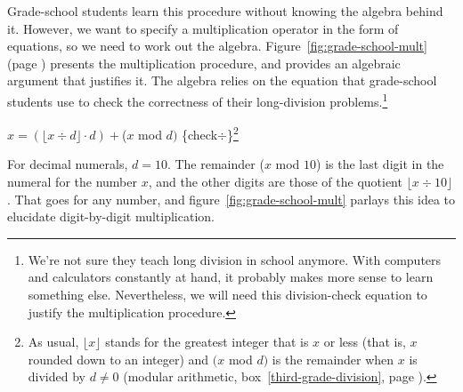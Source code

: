 Grade-school students learn this procedure
without knowing the algebra behind it.
However, we want to specify a
multiplication operator in the form of equations,
so we need to work out the algebra.
Figure~\ref{fig:grade-school-mult} (page \pageref{fig:grade-school-mult})
presents the multiplication procedure,
and provides an algebraic argument that justifies it.
The algebra relies on the equation
that grade-school students use to check the correctness of their long-division
problems.\footnote{We're not
sure they teach long division in school anymore.
With computers and calculators constantly at hand,
it probably makes more sense to learn something else.
Nevertheless, we will need this
division-check equation to justify the multiplication procedure.}

\hspace{2mm} $x = (\lfloor x \div d \rfloor \cdot d) + $($x$ mod $d)$ \hfill \{check$\div$\}\footnote{As usual,
$\lfloor x\rfloor$ stands for the greatest integer that is $x$ or less
(that is, $x$ rounded down to an integer)
and $(x$ mod $d)$ is the remainder when $x$ is divided by $d \neq 0$ (modular arithmetic,
box~\ref{third-grade-division}, page \pageref{third-grade-division}).}
\vspace{2mm}

For decimal numerals,  $d = 10$.
The remainder ($x$ mod $10$) is the last digit in the numeral for the number $x$,
and the other digits are those of the quotient $\lfloor x \div 10 \rfloor$.
That goes for any number, and
figure~\ref{fig:grade-school-mult}
parlays this idea to elucidate digit-by-digit multiplication.

